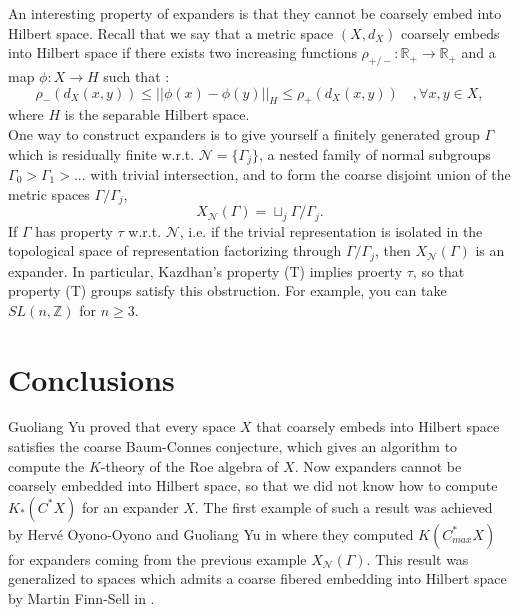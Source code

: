 \documentclass[a0,portrait]{a0poster}
\begin{document}
\begin{multicols}{2}
An interesting property of expanders is that they cannot be coarsely embed into Hilbert space. Recall that we say that a metric space $(X,d_X)$ coarsely embeds into Hilbert space if there exists two increasing functions $\rho_{+/-}: \mathbb R_+\rightarrow \mathbb R_+$ and a map $\phi : X\rightarrow H$ such that :
\[\rho_-(d_X(x,y))\leq ||\phi(x)-\phi(y)||_H \leq \rho_+(d_X(x,y))\quad,\forall x,y\in X,\]
where $H$ is the separable Hilbert space.\\

One way to construct expanders is to give yourself a finitely generated group $\Gamma$ which is residually finite w.r.t. $\mathcal N=\{\Gamma_j\}$, a nested family of normal subgroups $\Gamma_0 > \Gamma_1>...$ with trivial intersection, and to form the coarse disjoint union of the metric spaces $\Gamma/\Gamma_j$,
\[X_{\mathcal N}(\Gamma)=\sqcup_j \Gamma/\Gamma_j.\]
If $\Gamma$ has property $\tau$ w.r.t. $\mathcal N$, i.e. if the trivial representation is isolated in the topological space of representation factorizing through $\Gamma/\Gamma_j$, then $X_{\mathcal N}(\Gamma)$ is an expander. In particular, Kazdhan's property (T) implies proerty $\tau$, so that property (T) groups satisfy this obstruction. For example, you can take $SL(n,\mathbb Z)$ for $n\geq 3$. \\ 


\color{SaddleBrown} %

\section*{Conclusions}

Guoliang Yu proved \cite{yu} that every space $X$ that coarsely embeds into Hilbert space satisfies the coarse Baum-Connes conjecture, which gives an algorithm to compute the $K$-theory of the Roe algebra of $X$. Now expanders cannot be coarsely embedded into Hilbert space, so that we did not know how to compute $K_*(C^*X)$ for an expander $X$. The first example of such a result was achieved by Herv\'e Oyono-Oyono and Guoliang Yu in \cite{oyono} where they computed $K(C^*_{max}X)$ for expanders coming from the previous example $X_{\mathcal N}(\Gamma)$. This result was generalized to spaces which admits a coarse fibered embedding into Hilbert space by Martin Finn-Sell in \cite{finn}. \\


\end{multicols}
\end{document}
